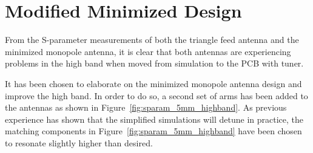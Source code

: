 \section{Modified Minimized Design}
From the S-parameter measurements of both the triangle feed antenna and the minimized monopole antenna, it is clear that both antennas are experiencing problems in the high band when moved from simulation to the PCB with tuner.

It has been chosen to elaborate on the minimized monopole antenna design and improve the high band. In order to do so, a second set of arms has been added to the antennas as shown in Figure~\ref{fig:sparam_5mm_highband}. As previous experience has shown that the simplified simulations will detune in practice, the matching components in Figure~\ref{fig:sparam_5mm_highband} have been chosen to resonate slightly higher than desired. 

